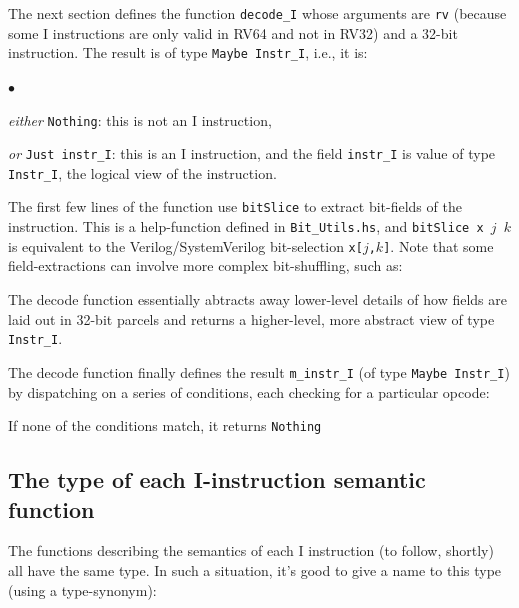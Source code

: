 \documentclass[11pt]{article}
\newenvironment{tightlist}%
{\begin{list}{$\bullet$}{%
    \setlength{\topsep}{0in}
    \setlength{\partopsep}{0in}
    \setlength{\itemsep}{0in}
    \setlength{\parsep}{0in}
    \setlength{\leftmargin}{1.5em}
    \setlength{\rightmargin}{0in}
    \setlength{\itemindent}{0in}
}
}%
{\end{list}
}
\begin{document}
The next section defines the function \verb|decode_I| whose arguments
are {\tt rv} (because some I instructions are only valid in RV64 and
not in RV32) and a 32-bit instruction.  The result is of type
\verb|Maybe Instr_I|, i.e., it is:

\begin{tightlist}

 \item \emph{either} \verb|Nothing|: this is not an I instruction,

 \item \emph{or} \verb|Just instr_I|: this is an I instruction, and
 the field \verb|instr_I| is value of type \verb|Instr_I|, the logical
 view of the instruction.

\end{tightlist}



The first few lines of the function use \verb|bitSlice| to extract
bit-fields of the instruction.  This is a help-function defined in
\verb|Bit_Utils.hs|, and {\tt bitSlice~x~$j$~$k$} is equivalent to the
Verilog/SystemVerilog bit-selection {\tt x[$j$,$k$]}.  Note that some
field-extractions can involve more complex bit-shuffling, such as:



The decode function essentially abtracts away lower-level details of
how fields are laid out in 32-bit parcels and returns a higher-level,
more abstract view of type \verb|Instr_I|.

The decode function finally defines the result \verb|m_instr_I| (of type
\verb|Maybe Instr_I|) by dispatching on a series of conditions, each
checking for a particular opcode:



If none of the conditions match, it returns \verb|Nothing|



\subsection{The type of each I-instruction semantic function}

The functions describing the semantics of each I instruction (to
follow, shortly) all have the same type.  In such a situation, it's
good to give a name to this type (using a type-synonym):


\end{document}
